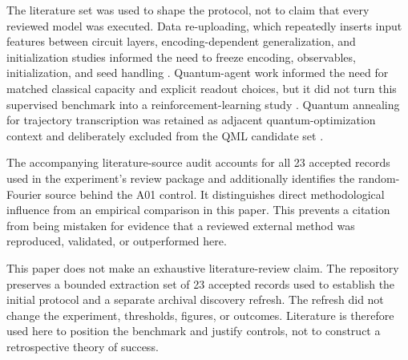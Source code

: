 The literature set was used to shape the protocol, not to claim that every
reviewed model was executed. Data re-uploading, which repeatedly inserts input
features between circuit layers, encoding-dependent
generalization, and initialization studies informed the need to freeze
encoding, observables, initialization, and seed handling
\cite{perez2020,caro2021,grant2019}. Quantum-agent work informed the need for
matched classical capacity and explicit readout choices, but it did not turn
this supervised benchmark into a reinforcement-learning study
\cite{skolik2022}. Quantum annealing for trajectory transcription was retained
as adjacent quantum-optimization context and deliberately excluded from the
QML candidate set \cite{degrossi2025}.

The accompanying literature-source audit accounts for all 23 accepted records
used in the experiment's review package and additionally identifies the
random-Fourier source behind the A01 control. It distinguishes direct
methodological influence from an empirical comparison in this paper. This
prevents a citation from being mistaken for evidence that a reviewed external
method was reproduced, validated, or outperformed here.

This paper does not make an exhaustive literature-review claim. The repository
preserves a bounded extraction set of 23 accepted records used to establish the
initial protocol and a separate archival discovery refresh. The refresh did
not change the experiment, thresholds, figures, or outcomes. Literature is
therefore used here to position the benchmark and justify controls, not to
construct a retrospective theory of success.
